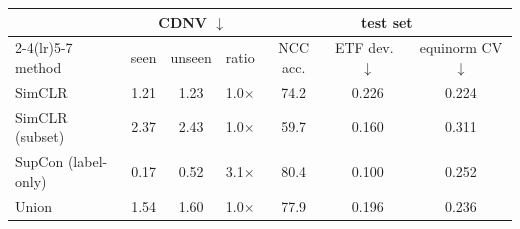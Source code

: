 \begin{tabular}{l ccc ccc}
\toprule
 & \multicolumn{3}{c}{CDNV $\downarrow$} & \multicolumn{3}{c}{test set} \\
\cmidrule(lr){2-4}\cmidrule(lr){5-7}
method & seen & unseen & ratio & NCC acc. & ETF dev.\ $\downarrow$ & equinorm CV $\downarrow$ \\
\midrule
SimCLR & 1.21 & 1.23 & 1.0$\times$ & 74.2 & 0.226 & 0.224 \\
SimCLR (subset) & 2.37 & 2.43 & 1.0$\times$ & 59.7 & 0.160 & 0.311 \\
SupCon (label-only) & 0.17 & 0.52 & 3.1$\times$ & 80.4 & 0.100 & 0.252 \\
Union & 1.54 & 1.60 & 1.0$\times$ & 77.9 & 0.196 & 0.236 \\
\bottomrule
\end{tabular}
